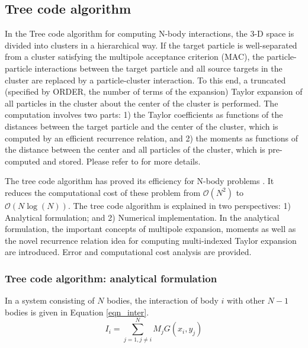 \documentclass[draftclsnofoot]{elsarticle}
\begin{document}
\subsection{Tree code algorithm}
In the Tree code algorithm for computing N-body interactions, the 3-D space is divided into clusters in a hierarchical way. If the target particle is well-separated from a cluster satisfying the multipole acceptance criterion (MAC), the particle-particle interactions between the target particle and all source targets in the cluster are replaced by a particle-cluster interaction. To this end, a truncated (specified by ORDER, the number of terms of the expansion) Taylor expansion of all particles in the cluster about the center of the cluster is performed. The computation involves two parts: 1) the Taylor coefficients as functions of the distances between the target particle and the center of the cluster, which is computed by an efficient recurrence relation, and 2) the moments as functions of the distance between the center and all particles of the cluster, which is pre-computed and stored. Please refer to \cite{krasny1} for more details.     

The tree code algorithm has proved its efficiency for N-body problems \cite{barnes}. It reduces the computational cost of these problem from $\mathcal{O}(N^2)$ to $\mathcal{O}(N\log(N))$. 
The tree code algorithm is explained in  two perspectives: 
1) Analytical formulation; and 2) Numerical implementation.  
In the analytical formulation, the important concepts of multipole expansion, moments as well as the novel recurrence relation idea for computing multi-indexed Taylor expansion are introduced.  Error and computational cost analysis are provided.


\subsubsection{Tree code algorithm: analytical formulation}

In a system consisting of $N$ bodies, 
the interaction of  body $i$ with other $N-1$ bodies is given in Equation \ref{eqn_inter}.  
\begin{equation}
\label{eqn_inter}
I_i = \sum\limits_{j=1,j\ne i}^{N} M_jG(x_i,y_j)
\end{equation}
\end{document}
